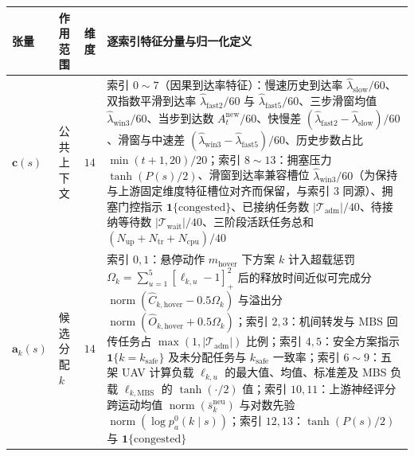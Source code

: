 \begin{table}[!htbp]
\centering
{}
\label{tab:ch5-feature-spec}
\sysucompacttable
\begin{tabularx}{\textwidth}{llc>{\raggedright\arraybackslash}X}
\toprule
张量 & 作用范围 & 维度 & 逐索引特征分量与归一化定义 \\
\midrule
$\mathbf c(s)$ & 公共上下文 & $14$ & 索引 $0\sim 7$（因果到达率特征）：慢速历史到达率 $\hat\lambda_{\mathrm{slow}}/60$、双指数平滑到达率 $\hat\lambda_{\mathrm{fast2}}/60$ 与 $\hat\lambda_{\mathrm{fast5}}/60$、三步滑窗均值 $\hat\lambda_{\mathrm{win3}}/60$、当步到达数 $A_t^{\mathrm{new}}/60$、快慢差 $(\hat\lambda_{\mathrm{fast2}}-\hat\lambda_{\mathrm{slow}})/60$、滑窗与中速差 $(\hat\lambda_{\mathrm{win3}}-\hat\lambda_{\mathrm{fast5}})/60$、历史步数占比 $\min(t+1,20)/20$；索引 $8\sim 13$：拥塞压力 $\tanh(P(s)/2)$、滑窗到达率兼容槽位 $\hat\lambda_{\mathrm{win3}}/60$（为保持与上游固定维度特征槽位对齐而保留，与索引 $3$ 同源）、拥塞门控指示 $\mathbf 1\{\mathrm{congested}\}$、已接纳任务数 $|\mathcal T_{\mathrm{adm}}|/40$、待接纳等待数 $|\mathcal T_{\mathrm{wait}}|/40$、三阶段活跃任务总和 $(N_{\mathrm{up}}+N_{\mathrm{tr}}+N_{\mathrm{cpu}})/40$ \\
$\mathbf a_k(s)$ & 候选分配 $k$ & $14$ & 索引 $0,1$：悬停动作 $m_{\mathrm{hover}}$ 下方案 $k$ 计入超载惩罚 $\Omega_k=\sum_{u=1}^5[\ell_{k,u}-1]_+^2$ 后的释放时间近似可完成分 $\operatorname{norm}(\widehat C_{k,\mathrm{hover}}-0.5\Omega_k)$ 与溢出分 $\operatorname{norm}(\widehat O_{k,\mathrm{hover}}+0.5\Omega_k)$；索引 $2,3$：机间转发与 MBS 回传任务占 $\max(1,|\mathcal T_{\mathrm{adm}}|)$ 比例；索引 $4,5$：安全方案指示 $\mathbf 1\{k=k_{\mathrm{safe}}\}$ 及未分配任务与 $k_{\mathrm{safe}}$ 一致率；索引 $6\sim 9$：五架 UAV 计算负载 $\ell_{k,u}$ 的最大值、均值、标准差及 MBS 负载 $\ell_{k,\mathrm{MBS}}$ 的 $\tanh(\cdot/2)$ 值；索引 $10,11$：上游神经评分跨运动均值 $\operatorname{norm}(\bar s_k^{\mathrm{neu}})$ 与对数先验 $\operatorname{norm}(\log p_a^0(k\mid s))$；索引 $12,13$：$\tanh(P(s)/2)$ 与 $\mathbf 1\{\mathrm{congested}\}$ \\

\end{tabularx}
\end{table}
